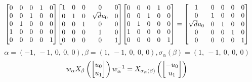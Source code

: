 \documentclass[11pt]{article}
\theoremstyle{definition}
\begin{document}
\[
\scaletoalign{\textwidth}{{\left[\begin{matrix}0 & 0 & 0 & 1 & 0\\0 & 0 & 1 & 0 & 0\\0 & 1 & 0 & 0 & 0\\1 & 0 & 0 & 0 & 0\\0 & 0 & 0 & 0 & 1\end{matrix}\right]} {\left[\begin{matrix}1 & 0 & 0 & 0 & 0\\0 & 1 & 0 & \sqrt{d} u_{0} & 0\\0 & 0 & 1 & 0 & 0\\0 & 0 & 0 & 1 & 0\\0 & 0 & 0 & 0 & 1\end{matrix}\right]} {\left[\begin{matrix}0 & 0 & 0 & 1 & 0\\0 & 0 & 1 & 0 & 0\\0 & 1 & 0 & 0 & 0\\1 & 0 & 0 & 0 & 0\\0 & 0 & 0 & 0 & 1\end{matrix}\right]} = {\left[\begin{matrix}1 & 0 & 0 & 0 & 0\\0 & 1 & 0 & 0 & 0\\\sqrt{d} u_{0} & 0 & 1 & 0 & 0\\0 & 0 & 0 & 1 & 0\\0 & 0 & 0 & 0 & 1\end{matrix}\right]}}
\]
\[
\alpha = \left( -1, \  -1, \  0, \  0, \  0\right), \beta = \left( 1, \  -1, \  0, \  0, \  0\right), \sigma_{\alpha}(\beta) = \left( 1, \  -1, \  0, \  0, \  0\right)
\]
\[
\scaletoalign{\textwidth}{w_{\alpha} X_{\beta}\left(\left[\begin{matrix}u_{0}\\u_{1}\end{matrix}\right]\right) w_{\alpha}^{-1} = X_{\sigma_{\alpha}\left(\beta\right)}\left(\left[\begin{matrix}- u_{0}\\u_{1}\end{matrix}\right]\right)}
\]
\end{document}
